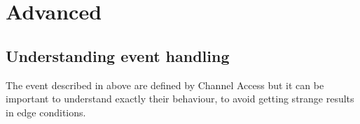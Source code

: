 \documentclass[letterpaper,10pt,english]{sphinxmanual}
\begin{document}
%
\begin{sphinxVerbatim}[commandchars=\\\{\}]
 
        
          

          
          

\end{sphinxVerbatim}


\section{Advanced}
\label{\detokenize{advanced:advanced}}\label{\detokenize{advanced::doc}}

\subsection{Understanding event handling}
\label{\detokenize{advanced:understanding-event-handling}}
The event described in {\hyperref[\detokenize{fsm:event-types}]{}} above are defined by Channel Access
but it can be important to understand exactly their behaviour, to avoid getting
strange results in edge conditions.
\end{document}
